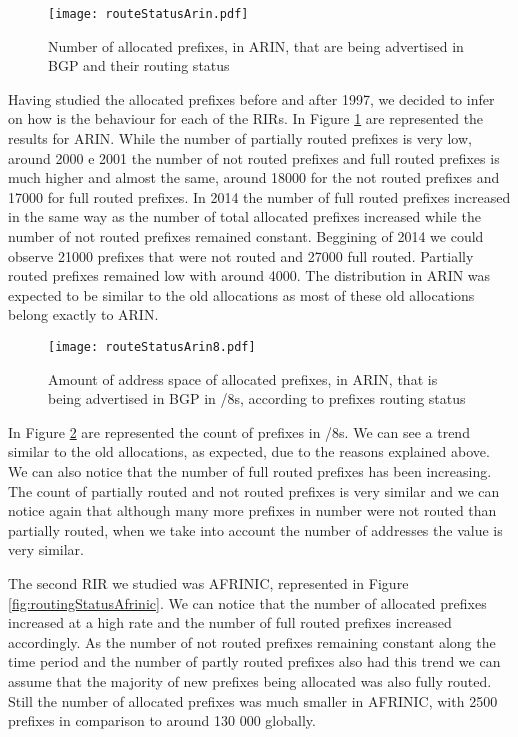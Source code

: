\documentclass[11pt,a4paper]{scrreprt}
\begin{document}
\begin{figure}[!h]
\centering
\texttt{[image: routeStatusArin.pdf]}
\caption{Number of allocated prefixes, in ARIN, that are being advertised in BGP and their routing status}
\label{fig:routingStatusArin}
\end{figure}

Having studied the allocated prefixes before and after 1997, we decided to infer on how is the behaviour for each of the RIRs. In Figure \ref{fig:routingStatusArin} are represented the results for ARIN.  
While the number of partially routed prefixes is very low, around 2000 e 2001 the number of not routed prefixes and full routed prefixes is much higher and almost the same, around 18000 for the not routed prefixes and 17000 for full routed prefixes. In 2014 the number of full routed prefixes increased in the same way as the number of total allocated prefixes increased while the number of not routed prefixes remained constant. Beggining of 2014 we could observe 21000 prefixes that were not routed and 27000 full routed. Partially routed prefixes remained low with around 4000. The distribution in ARIN was expected to be similar to the old allocations as most of these old allocations belong exactly to ARIN. 

\begin{figure}[!h]
\centering
\texttt{[image: routeStatusArin8.pdf]}
\caption{Amount of address space of allocated prefixes, in ARIN, that is being advertised in BGP in /8s, according to prefixes routing status}
\label{fig:routingStatusArin8}
\end{figure}

In Figure \ref{fig:routingStatusArin8} are represented the count of prefixes in /8s. We can see a trend similar to the old allocations, as expected, due to the reasons explained above. We can also notice that the number of full routed prefixes has been increasing. The count of partially routed and not routed prefixes is very similar and we can notice again that although many more prefixes in number were not routed than partially routed, when we take into account the number of addresses the value is very similar. 

The second RIR we studied was AFRINIC, represented in Figure \ref{fig:routingStatusAfrinic}. We can notice that the number of allocated prefixes increased at a high rate and the number of full routed prefixes increased accordingly. As the number of not routed prefixes remaining constant along the time period and the number of partly routed prefixes also had this trend we can assume that the majority of new prefixes being allocated was also fully routed. Still the number of allocated prefixes was much smaller in AFRINIC, with 2500 prefixes in comparison to  around 130 000 globally. 
\end{document}

